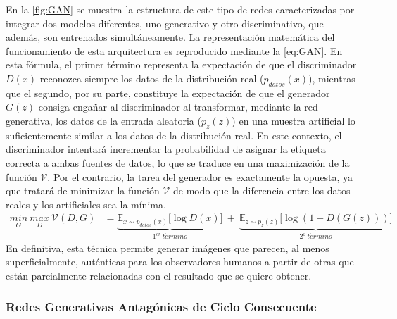 En la \autoref{fig:GAN} se muestra la estructura de este tipo de redes caracterizadas por integrar dos modelos diferentes, uno generativo y otro discriminativo, que además, son entrenados simultáneamente. La representación matemática del funcionamiento de esta arquitectura es reproducido mediante la \autoref{eq:GAN}. En esta fórmula, el primer término representa la expectación de que el discriminador $D(x)$ reconozca siempre los datos de la distribución real ($p_{datos}(x)$), mientras que el segundo, por su parte, constituye la expectación de que el generador $G(z)$ consiga engañar al discriminador al transformar, mediante la red generativa, los datos de la entrada aleatoria ($p_z(z)$) en una muestra artificial lo suficientemente similar a los datos de la distribución real. En este contexto, el discriminador intentará incrementar la probabilidad de asignar la etiqueta correcta a ambas fuentes de datos, lo que se traduce en una maximización de la función $\mathcal{V}$. Por el contrario, la tarea del generador es exactamente la opuesta, ya que tratará de minimizar la función $\mathcal{V}$ de modo que la diferencia entre los datos reales y los artificiales sea la mínima.
\begin{align} \label{eq:GAN}
    \underset{G}{min} \ \underset{D}{max} \ \mathcal{V}(D, G) &= \underbrace{\mathbb{E}_{x\sim p_{datos}(x)} \big[\log D(x)\big]}_{1^{er} \ t\acute{e}rmino} \ + \ \underbrace{\mathbb{E}_{z\sim p_{z}(z)} \big[\log (1- D(G(z)))\big]}_{2^{o} \ t\acute{e}rmino}
\end{align}
En definitiva, esta técnica permite generar imágenes que parecen, al menos superficialmente, auténticas para los observadores humanos a partir de otras que están parcialmente relacionadas con el resultado que se quiere obtener.

\subsubsection{Redes Generativas Antagónicas de Ciclo Consecuente}

